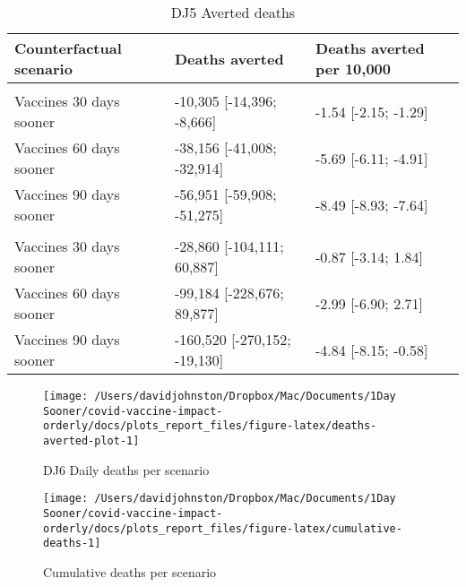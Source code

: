 \documentclass[
  12pt,
]{article}
\begin{document}
\begin{table}

\caption{\label{tab:deaths-averted-table}DJ5 Averted deaths}
\centering
\begin{tabular}[t]{lll}
\toprule
Counterfactual scenario & Deaths averted & Deaths averted per 10,000\\
\midrule
\addlinespace[0.3em]
\multicolumn{3}{l}{\textbf{United Kingdom}}\\
\hspace{1em}Vaccines 30 days sooner & -10,305 [-14,396; -8,666] & -1.54 [-2.15; -1.29]\\
\hspace{1em}Vaccines 60 days sooner & -38,156 [-41,008; -32,914] & -5.69 [-6.11; -4.91]\\
\hspace{1em}Vaccines 90 days sooner & -56,951 [-59,908; -51,275] & -8.49 [-8.93; -7.64]\\
\addlinespace[0.3em]
\multicolumn{3}{l}{\textbf{United States}}\\
\hspace{1em}Vaccines 30 days sooner & -28,860 [-104,111; 60,887] & -0.87 [-3.14; 1.84]\\
\hspace{1em}Vaccines 60 days sooner & -99,184 [-228,676; 89,877] & -2.99 [-6.90; 2.71]\\
\hspace{1em}Vaccines 90 days sooner & -160,520 [-270,152; -19,130] & -4.84 [-8.15; -0.58]\\
\bottomrule
\end{tabular}
\end{table}

\begin{figure}

{\centering \texttt{[image: /Users/davidjohnston/Dropbox/Mac/Documents/1Day Sooner/covid-vaccine-impact-orderly/docs/plots\_report\_files/figure-latex/deaths-averted-plot-1]} 

}

\caption{DJ6 Daily deaths per scenario}\label{fig:deaths-averted-plot}
\end{figure}
\begin{figure}

{\centering \texttt{[image: /Users/davidjohnston/Dropbox/Mac/Documents/1Day Sooner/covid-vaccine-impact-orderly/docs/plots\_report\_files/figure-latex/cumulative-deaths-1]} 

}

\caption{Cumulative deaths per scenario}\label{fig:cumulative-deaths}
\end{figure}
\end{document}
